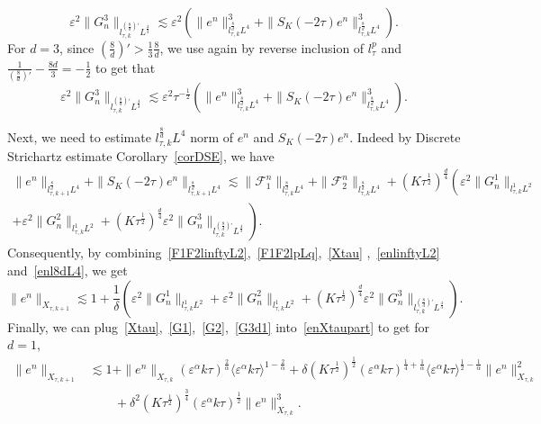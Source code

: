 \documentclass[10pt,a4paper]{article}
\begin{document}
  \begin{equation}\label{G3d2}
    \varepsilon^2 \|G_n^3\|_{l^{(\frac8d)'}_{\tau,k}L^\frac43} \lesssim \varepsilon^2
    \left(\|e^n\|^3_{l^\frac8d_{\tau,k}L^4} + \|S_K(-2\tau)e^n\|_{l^\frac8d_{\tau,k}L^4}^3\right).
  \end{equation}
  For \(d=3\), since \((\frac8d)' > \frac13\frac8d\), we use again by reverse
  inclusion of \(l^p_\tau\) and \( \frac1{(\frac8d)'} - \frac{8d}3 = -\frac12\)
  to get that 
  \begin{equation}\label{G3d3}
    \varepsilon^2 \|G_n^3\|_{l^{(\frac8d)'}_{\tau,k}L^\frac43} \lesssim \varepsilon^2 \tau^{-\frac12}
    \left(\|e^n\|^3_{l^\frac8d_{\tau,k}L^4} + \|S_K(-2\tau)e^n\|_{l^\frac8d_{\tau,k}L^4}^3\right).
  \end{equation}

  Next, we need to estimate \(l^\frac8d_{\tau,k}L^4\) norm of \(e^n\) and
  \(S_K(-2\tau)e^n\). Indeed by Discrete Strichartz estimate Corollary~\ref{corDSE},
  we have
  \begin{multline}\label{enl8dL4}
    \|e^n\|_{l^\frac8d_{\tau,k+1}L^4} + \|S_K(-2\tau)e^n\|_{l^\frac8d_{\tau,k+1}L^4} 
    \lesssim \|\mathcal F_1^n\|_{l^\frac8d_{\tau,k}L^4} + 
    \|\mathcal F_2^n\|_{l^\frac8d_{\tau,k}L^4} + (K\tau^\frac12)^\frac d4 \left(
    \varepsilon^2\|G_n^1\|_{l^1_{\tau,k}L^2} \right. \\ \left.
    + \varepsilon^2\|G_n^2\|_{l^1_{\tau,k}L^2} + (K\tau^\frac12)^\frac d4 
    \varepsilon^2\|G_n^3\|_{l^{(\frac8d)'}_{\tau,k}L^\frac43}\right) .
  \end{multline}
  Consequently, by combining~\eqref{F1F2linftyL2},~\eqref{F1F2lpLq},~\eqref{Xtau}
  ,~\eqref{enlinftyL2} and~\eqref{enl8dL4}, we get 
  \begin{equation}\label{enXtaupart}
    \|e^n\|_{X_{\tau,k+1}} \lesssim 1 + \frac1\delta \left( 
    \varepsilon^2\|G_n^1\|_{l^1_{\tau,k}L^2} + \varepsilon^2\|G_n^2\|_{l^1_{\tau,k}L^2} 
    + (K\tau^\frac12)^\frac d4 \varepsilon^2\|G_n^3\|_{l^{(\frac8d)'}_{\tau,k}L^\frac43}\right).
  \end{equation}
  Finally, we can plug~\eqref{Xtau},~\eqref{G1},~\eqref{G2},~\eqref{G3d1} into~\eqref{enXtaupart}
  to get for \(d=1\),
  \begin{equation*}
    \begin{aligned}
      \|e^n\|_{X_{\tau,k+1}} &\lesssim 1 + \|e^n\|_{X_{\tau,k}} 
      (\varepsilon^\alpha k\tau)^\frac2\alpha \langle\varepsilon^\alpha k\tau\rangle^{1-\frac2\alpha} %
      + \delta(K\tau^\frac12)^\frac12 (\varepsilon^\alpha k\tau)^{\frac14+\frac1\alpha}
      \langle\varepsilon^\alpha k\tau\rangle^{\frac12-\frac1\alpha} \|e^n\|_{X_{\tau,k}}^2 \\
      & \qquad + \delta^2(K\tau^\frac12)^\frac34 (\varepsilon^\alpha k\tau)^\frac12 
      \|e^n\|_{X_{\tau,k}}^3.
    \end{aligned}
  \end{equation*}
\end{document}
